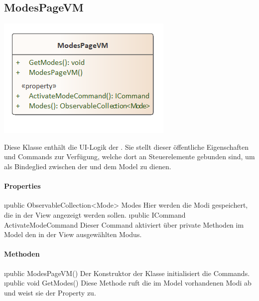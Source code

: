 \documentclass[../entwurf.tex]{subfiles}
\begin{document}
\subsection{ModesPageVM}
\begin{minipage}{0.5\textwidth}
\includegraphics[scale=0.75]{../graphics/vm_klassen/ModesPageVM.png}
\end{minipage}
\begin{minipage}{0.5\textwidth}
Diese Klasse enthält die UI-Logik der . Sie stellt dieser öffentliche Eigenschaften und Commands zur Verfügung, welche dort an Steuerelemente gebunden sind, um als Bindeglied zwischen der  und dem Model zu dienen.
\end{minipage}
\paragraph{Properties}
\begin{itemize}
	\i{public ObservableCollection<Mode> Modes} Hier werden die Modi gespeichert, die in der View angezeigt werden sollen.
	\i{public ICommand ActivateModeCommand} Dieser Command aktiviert über private Methoden im Model den in der View ausgewählten Modus. 
\end{itemize}
\paragraph{Methoden}
\begin{itemize}
	\i{public ModesPageVM()} Der Konstruktor der Klasse initialisiert die Commands.
	\i{public void GetModes()} Diese Methode ruft die im Model vorhandenen Modi ab und weist sie der Property  zu.
\end{itemize}
\end{document}
